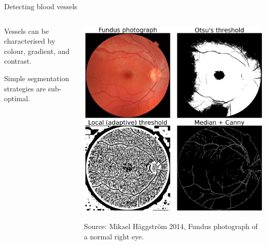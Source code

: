\documentclass[9pt, aspectratio=169]{beamer}
\begin{document}
\begin{frame}
    {Detecting blood vessels}
    \begin{columns}
        \begin{column}{.5\textwidth}
            Vessels can be characterised by colour, gradient, and contrast.
            \vspace{1em}

            Simple segmentation strategies are sub-optimal.
        \end{column}
        \begin{column}{.5\textwidth}
            \centering
            \includegraphics[width=\textwidth]{retina_thresholding.png}

            \footnotesize
            \raggedright
            Source: Mikael H\"aggstr\"om 2014, Fundus photograph of a normal right eye.
        \end{column}
    \end{columns}
\end{frame}
\end{document}
